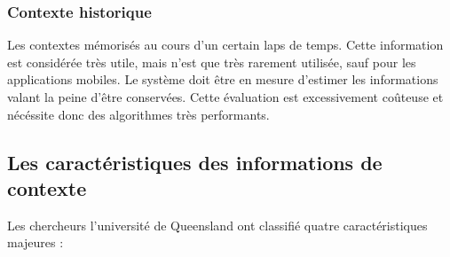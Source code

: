 \subsubsection{Contexte historique}

Les contextes mémorisés au cours d'un certain laps de temps. Cette information
est considérée très utile, mais n'est que très rarement utilisée, sauf pour les
applications mobiles. Le système doit être en mesure d'estimer les informations
valant la peine d'être conservées. Cette évaluation est excessivement coûteuse
et nécéssite donc des algorithmes très performants.

\subsection{Les caractéristiques des informations de contexte}

Les chercheurs l'université de Queensland ont classifié quatre caractéristiques
majeures : \cite{catharina_context_2002}


